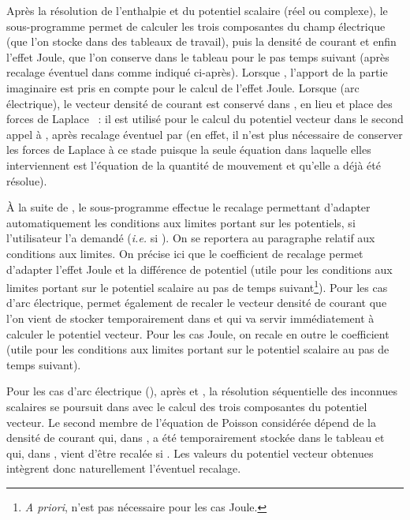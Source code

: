 Apr\`es la r\'esolution de l'enthalpie et du potentiel scalaire
(r\'eel ou complexe), le sous-programme  permet de calculer
les trois composantes du champ \'electrique
(que l'on stocke dans des tableaux de travail), puis la densit\'e de courant
et enfin l'effet Joule, que l'on conserve dans le tableau 
pour le pas temps suivant (apr\`es recalage \'eventuel dans  comme
indiqu\'e ci-apr\`es).
Lorsque ,  l'apport de la partie imaginaire est pris en
compte pour le calcul de l'effet Joule. Lorsque 
(arc \'electrique), le vecteur densit\'e de courant est
conserv\'e dans , en lieu et place des forces de Laplace
~: il est utilis\'e pour le calcul du potentiel vecteur dans le
second appel \`a ,
apr\`es recalage \'eventuel par  (en effet, il n'est plus
n\'ecessaire de conserver les forces de Laplace \`a ce stade puisque
la seule \'equation dans laquelle elles interviennent est l'\'equation de la
quantit\'e de mouvement et qu'elle a d\'ej\`a \'et\'e r\'esolue).

\`A la suite de ,
le sous-programme  effectue le recalage permettant d'adapter automatiquement
les conditions aux limites portant sur les potentiels, si l'utilisateur l'a
demand\'e ({\it i.e.} si ).
On se reportera au paragraphe relatif aux conditions aux limites. On pr\'ecise
ici que le coefficient de recalage  permet d'adapter l'effet Joule
 et la diff\'erence de potentiel 
(utile pour les conditions aux limites portant sur le potentiel scalaire au pas
de temps suivant\footnote{{\it A priori},  n'est pas n\'ecessaire pour les
cas Joule.}).
Pour les cas d'arc \'electrique,  permet \'egalement de
recaler le vecteur densit\'e de courant que l'on vient
de stocker temporairement dans  et qui va
servir imm\'ediatement \`a calculer le potentiel vecteur.
Pour les cas Joule,  on recale en outre le coefficient  (utile
pour les conditions aux limites portant sur le potentiel scalaire au pas de
temps suivant).

Pour les cas d'arc \'electrique (),
apr\`es  et ,
la r\'esolution s\'equentielle des inconnues scalaires se poursuit dans
 avec le calcul des trois composantes du potentiel vecteur. Le second membre de
l'\'equation de Poisson consid\'er\'ee d\'epend de la densit\'e de courant qui,
dans , a \'et\'e temporairement stock\'ee dans le tableau
 et qui,  dans , vient d'\^etre
recal\'ee si .
Les valeurs du potentiel vecteur obtenues int\`egrent donc  naturellement l'\'eventuel
recalage.

